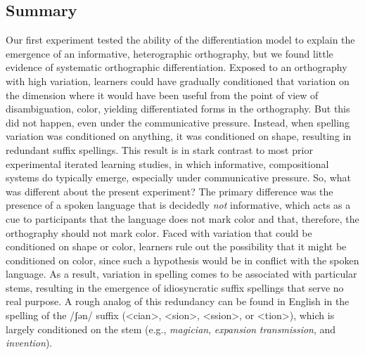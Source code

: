 \documentclass[doc,biblatex]{apa7}
\begin{document}
\subsection{Summary}

Our first experiment tested the ability of the differentiation model to explain the emergence of an informative, heterographic orthography, but we found little evidence of systematic orthographic differentiation. Exposed to an orthography with high variation, learners could have gradually conditioned that variation on the dimension where it would have been useful from the point of view of disambiguation, color, yielding differentiated forms in the orthography. But this did not happen, even under the communicative pressure. Instead, when spelling variation was conditioned on anything, it was conditioned on shape, resulting in redundant suffix spellings. This result is in stark contrast to most prior experimental iterated learning studies, in which informative, compositional systems do typically emerge, especially under communicative pressure. So, what was different about the present experiment? The primary difference was the presence of a spoken language that is decidedly \textit{not} informative, which acts as a cue to participants that the language does not mark color and that, therefore, the orthography should not mark color. Faced with variation that could be conditioned on shape or color, learners rule out the possibility that it might be conditioned on color, since such a hypothesis would be in conflict with the spoken language. As a result, variation in spelling comes to be associated with particular stems, resulting in the emergence of idiosyncratic suffix spellings that serve no real purpose. A rough analog of this redundancy can be found in English in the spelling of the /ʃən/ suffix (<cian>, <sion>, <ssion>, or <tion>), which is largely conditioned on the stem (e.g., \textit{magician}, \textit{expansion} \textit{transmission}, and \textit{invention}).
\end{document}
